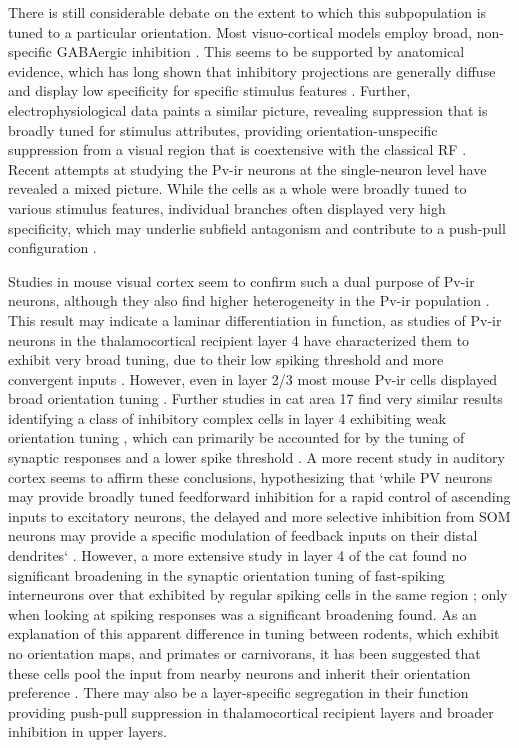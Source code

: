 There is still considerable debate on the extent to which this
subpopulation is tuned to a particular orientation. Most
visuo-cortical models employ broad, non-specific GABAergic inhibition
\citep{Somers1998,Troyer1998}. This seems to be supported by
anatomical evidence, which has long shown that inhibitory projections
are generally diffuse and display low specificity for specific
stimulus features \citep{Albus1994,Kisvarday1997a}. Further,
electrophysiological data paints a similar picture, revealing
suppression that is broadly tuned for stimulus attributes, providing
orientation-unspecific suppression from a visual region that is
coextensive with the classical RF \citep{DeAngelis1992}. Recent
attempts at studying the Pv-ir neurons at the single-neuron level have
revealed a mixed picture. While the cells as a whole were broadly
tuned to various stimulus features, individual branches often
displayed very high specificity, which may underlie subfield
antagonism and contribute to a push-pull configuration
\citep{Kisvarday2002}. 

Studies in mouse visual cortex seem to confirm such a dual purpose of
Pv-ir neurons, although they also find higher heterogeneity in the
Pv-ir population \citep{Runyan2010}. This result may indicate a
laminar differentiation in function, as studies of Pv-ir neurons in
the thalamocortical recipient layer 4 have characterized them to
exhibit very broad tuning, due to their low spiking threshold and more
convergent inputs \citep{Ma2011}. However, even in layer 2/3 most
mouse Pv-ir cells displayed broad orientation tuning
\citep{Hofer2011}. Further studies in cat area 17 find very similar
results identifying a class of inhibitory complex cells in layer 4
exhibiting weak orientation tuning \citep{Hirsch2003}, which can
primarily be accounted for by the tuning of synaptic responses and a
lower spike threshold \citep{Nowak2008}.  A more recent study in
auditory cortex seems to affirm these conclusions, hypothesizing that
`while PV neurons may provide broadly tuned feedforward inhibition for
a rapid control of ascending inputs to excitatory neurons, the delayed
and more selective inhibition from SOM neurons may provide a specific
modulation of feedback inputs on their distal dendrites`
\citep{Li2014}. However, a more extensive study in layer 4 of the cat
found no significant broadening in the synaptic orientation tuning of
fast-spiking interneurons over that exhibited by regular spiking cells
in the same region \citep{Cardin2007}; only when looking at spiking
responses was a significant broadening found. As an explanation of
this apparent difference in tuning between rodents, which exhibit no
orientation maps, and primates or carnivorans, it has been suggested
that these cells pool the input from nearby neurons and inherit their
orientation preference \citep{Isaacson2011}. There may also be a
layer-specific segregation in their function providing push-pull
suppression in thalamocortical recipient layers and broader inhibition
in upper layers.

